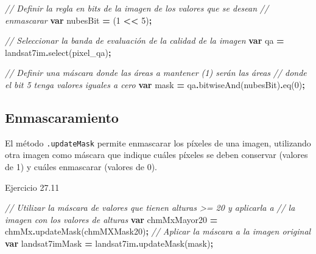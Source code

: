\documentclass[
  12pt,
  letterpaper,
  twoside]{book}
\newenvironment{Shaded}{\begin{snugshade}}{\end{snugshade}}
\newcommand{\CommentTok}[1]{\textcolor[rgb]{0.56,0.35,0.01}{\textit{#1}}}
\newcommand{\DecValTok}[1]{\textcolor[rgb]{0.00,0.00,0.81}{#1}}
\newcommand{\FunctionTok}[1]{\textcolor[rgb]{0.00,0.00,0.00}{#1}}
\newcommand{\KeywordTok}[1]{\textcolor[rgb]{0.13,0.29,0.53}{\textbf{#1}}}
\newcommand{\NormalTok}[1]{#1}
\newcommand{\OperatorTok}[1]{\textcolor[rgb]{0.81,0.36,0.00}{\textbf{#1}}}
\newcommand{\StringTok}[1]{\textcolor[rgb]{0.31,0.60,0.02}{#1}}
\begin{document}
\begin{Shaded}
\begin{Highlighting}[]
\CommentTok{// Definir la regla en bits de la imagen de los valores que se desean }
\CommentTok{// enmascarar}
\KeywordTok{var}\NormalTok{ nubesBit }\OperatorTok{=}\NormalTok{ (}\DecValTok{1} \OperatorTok{\textless{}\textless{}} \DecValTok{5}\NormalTok{)}\OperatorTok{;}

\CommentTok{// Seleccionar la banda de evaluación de la calidad de la imagen}
\KeywordTok{var}\NormalTok{ qa }\OperatorTok{=}\NormalTok{ landsat7im}\OperatorTok{.}\FunctionTok{select}\NormalTok{(}\StringTok{\textquotesingle{}pixel\_qa\textquotesingle{}}\NormalTok{)}\OperatorTok{;}

\CommentTok{// Definir una máscara donde las áreas a mantener (1) serán las áreas }
\CommentTok{// donde el bit 5 tenga valores iguales a cero}
\KeywordTok{var}\NormalTok{ mask }\OperatorTok{=}\NormalTok{ qa}\OperatorTok{.}\FunctionTok{bitwiseAnd}\NormalTok{(nubesBit)}\OperatorTok{.}\FunctionTok{eq}\NormalTok{(}\DecValTok{0}\NormalTok{)}\OperatorTok{;}
\end{Highlighting}
\end{Shaded}

\hypertarget{enmascaramiento}{%
\subsection{Enmascaramiento}\label{enmascaramiento}}

El método \texttt{.updateMask} permite enmascarar los píxeles de una imagen, utilizando otra imagen como máscara que indique cuáles píxeles se deben conservar (valores de 1) y cuáles enmascarar (valores de 0).

Ejercicio 27.11

\begin{Shaded}
\begin{Highlighting}[]
\CommentTok{// Utilizar la máscara de valores que tienen alturas \textgreater{}= 20 y aplicarla a }
\CommentTok{// la imagen con los valores de alturas}
\KeywordTok{var}\NormalTok{ chmMxMayor20 }\OperatorTok{=}\NormalTok{ chmMx}\OperatorTok{.}\FunctionTok{updateMask}\NormalTok{(chmMXMask20)}\OperatorTok{;}
\CommentTok{// Aplicar la máscara a la imagen original}
\KeywordTok{var}\NormalTok{ landsat7imMask }\OperatorTok{=}\NormalTok{ landsat7im}\OperatorTok{.}\FunctionTok{updateMask}\NormalTok{(mask)}\OperatorTok{;}
\end{Highlighting}
\end{Shaded}
\end{document}
